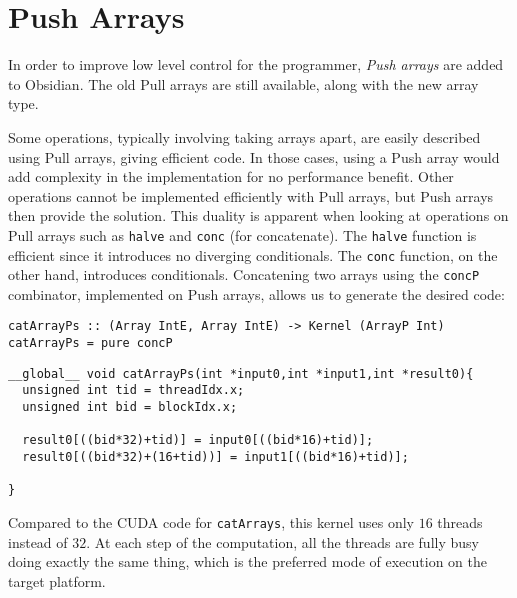 \section{Push Arrays}

In order to improve low level control for the programmer, {\em Push
arrays} are added to Obsidian. The old Pull arrays are still available,
along with the new array type. 

Some operations, typically involving taking arrays apart,
are easily described using Pull arrays, giving
efficient code. In those cases, using a Push array would add complexity in the 
implementation for no performance benefit.
Other operations cannot be implemented efficiently
with Pull arrays, but Push arrays then provide the solution.
This duality is apparent when looking at operations on Pull arrays such as
{\tt halve} and {\tt conc} (for concatenate). 
The {\tt halve} function is efficient since it introduces no diverging 
conditionals. The {\tt conc} function, on the other hand, introduces conditionals.
Concatening two arrays using the {\tt concP} combinator, implemented on Push arrays, 
allows us to generate the desired code:

\begin{codesize}
\begin{verbatim}
catArrayPs :: (Array IntE, Array IntE) -> Kernel (ArrayP Int)
catArrayPs = pure concP
\end{verbatim}
\end{codesize} 

\begin{codesize}
\begin{verbatim}
__global__ void catArrayPs(int *input0,int *input1,int *result0){
  unsigned int tid = threadIdx.x;
  unsigned int bid = blockIdx.x;
  
  result0[((bid*32)+tid)] = input0[((bid*16)+tid)];
  result0[((bid*32)+(16+tid))] = input1[((bid*16)+tid)];
  
}
\end{verbatim}
\end{codesize}

\noindent
Compared to the CUDA code for {\tt catArrays}, this kernel 
uses only $16$ threads instead of $32$. At each step of the computation, all 
the threads are fully busy doing exactly the same thing, which is the preferred 
mode of execution on the target platform. 
 


